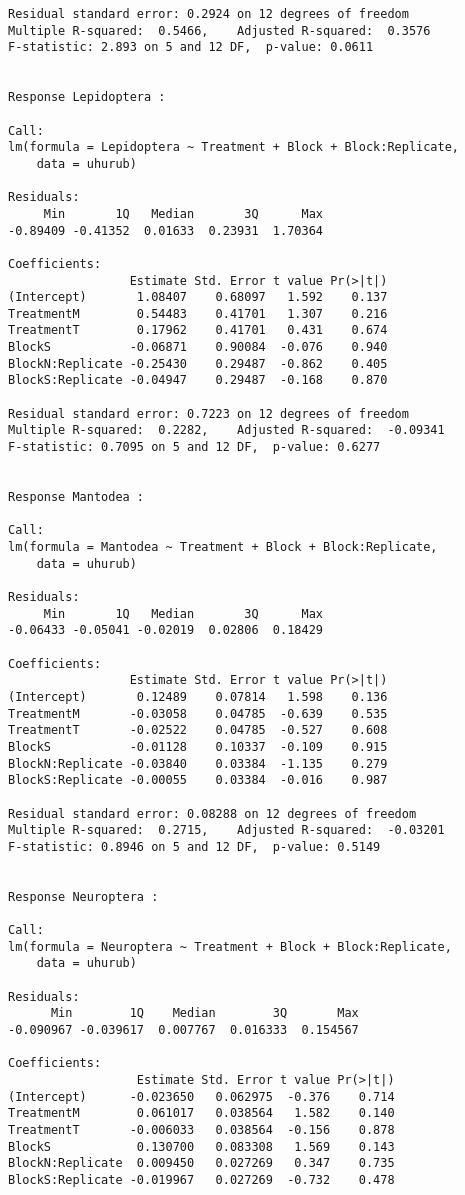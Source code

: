 \documentclass[11pt]{article}
\begin{document}
\begin{verbatim}
Residual standard error: 0.2924 on 12 degrees of freedom
Multiple R-squared:  0.5466,	Adjusted R-squared:  0.3576 
F-statistic: 2.893 on 5 and 12 DF,  p-value: 0.0611


Response Lepidoptera :

Call:
lm(formula = Lepidoptera ~ Treatment + Block + Block:Replicate, 
    data = uhurub)

Residuals:
     Min       1Q   Median       3Q      Max 
-0.89409 -0.41352  0.01633  0.23931  1.70364 

Coefficients:
                 Estimate Std. Error t value Pr(>|t|)
(Intercept)       1.08407    0.68097   1.592    0.137
TreatmentM        0.54483    0.41701   1.307    0.216
TreatmentT        0.17962    0.41701   0.431    0.674
BlockS           -0.06871    0.90084  -0.076    0.940
BlockN:Replicate -0.25430    0.29487  -0.862    0.405
BlockS:Replicate -0.04947    0.29487  -0.168    0.870

Residual standard error: 0.7223 on 12 degrees of freedom
Multiple R-squared:  0.2282,	Adjusted R-squared:  -0.09341 
F-statistic: 0.7095 on 5 and 12 DF,  p-value: 0.6277


Response Mantodea :

Call:
lm(formula = Mantodea ~ Treatment + Block + Block:Replicate, 
    data = uhurub)

Residuals:
     Min       1Q   Median       3Q      Max 
-0.06433 -0.05041 -0.02019  0.02806  0.18429 

Coefficients:
                 Estimate Std. Error t value Pr(>|t|)
(Intercept)       0.12489    0.07814   1.598    0.136
TreatmentM       -0.03058    0.04785  -0.639    0.535
TreatmentT       -0.02522    0.04785  -0.527    0.608
BlockS           -0.01128    0.10337  -0.109    0.915
BlockN:Replicate -0.03840    0.03384  -1.135    0.279
BlockS:Replicate -0.00055    0.03384  -0.016    0.987

Residual standard error: 0.08288 on 12 degrees of freedom
Multiple R-squared:  0.2715,	Adjusted R-squared:  -0.03201 
F-statistic: 0.8946 on 5 and 12 DF,  p-value: 0.5149


Response Neuroptera :

Call:
lm(formula = Neuroptera ~ Treatment + Block + Block:Replicate, 
    data = uhurub)

Residuals:
      Min        1Q    Median        3Q       Max 
-0.090967 -0.039617  0.007767  0.016333  0.154567 

Coefficients:
                  Estimate Std. Error t value Pr(>|t|)
(Intercept)      -0.023650   0.062975  -0.376    0.714
TreatmentM        0.061017   0.038564   1.582    0.140
TreatmentT       -0.006033   0.038564  -0.156    0.878
BlockS            0.130700   0.083308   1.569    0.143
BlockN:Replicate  0.009450   0.027269   0.347    0.735
BlockS:Replicate -0.019967   0.027269  -0.732    0.478


\end{verbatim}
\end{document}
